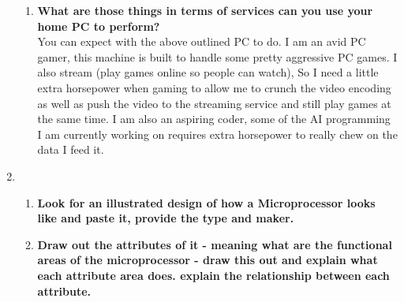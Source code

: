 \documentclass[]{article}
\begin{document}
\begin{enumerate}
\begin{enumerate}
	\item \textbf{What are those things in terms of services can you use your home PC to perform?}
				\smallskip
				\\You can expect with the above outlined PC to do.  I am an avid PC gamer, this machine is built to handle some pretty aggressive PC games.  I also stream (play games online so people can watch), So I need a little extra horsepower when gaming to allow me to crunch the video encoding as well as push the video to the streaming service and still play games at the same time.  I am also an aspiring coder, some of the AI programming I am currently working on requires extra horsepower to really chew on the data I feed it.
	
\end{enumerate}

\item 
\begin{enumerate}
	\item \textbf{Look for an illustrated design of how a Microprocessor looks like and paste it, provide the type and maker.}
	
	\item \textbf{Draw out the attributes of it - meaning what are the functional areas of the microprocessor - draw this out and explain what each attribute area does.  explain the relationship between each attribute.}
\end{enumerate}
\end{enumerate}
\end{document}
